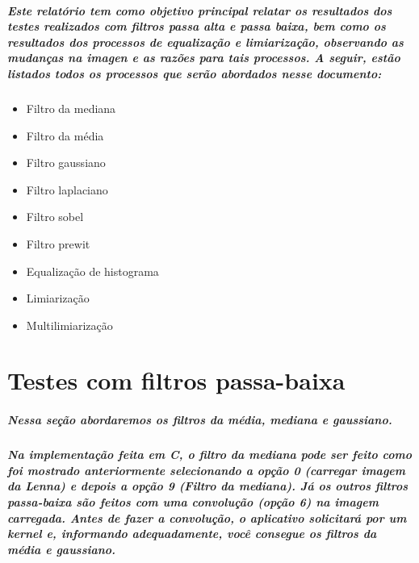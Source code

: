 \documentclass[12pt,fleqn]{article}
\begin{document}


  \subparagraph{\normalfont Este relatório tem como objetivo principal relatar os resultados dos testes realizados com filtros 
passa alta e passa baixa, bem como os resultados dos processos de equalização e limiarização, observando as mudanças
na imagen e as razões para tais processos. A seguir, estão listados todos os processos que serão abordados nesse documento:}

\begin{itemize}
  \item Filtro da mediana
  \item Filtro da média
  \item Filtro gaussiano
  \item Filtro laplaciano
  \item Filtro sobel
  \item Filtro prewit
  \item Equalização de histograma
  \item Limiarização
  \item Multilimiarização
\end{itemize}


\section{Testes com filtros passa-baixa}

  \subparagraph{\normalfont Nessa seção abordaremos os filtros da média, mediana e gaussiano.}

  \subparagraph{\normalfont Na implementação feita em C, o filtro da mediana pode ser feito como foi mostrado anteriormente selecionando a opção 0 (carregar imagem da Lenna) e depois a opção 9 (Filtro da mediana). Já os outros filtros  passa-baixa são feitos com uma convolução (opção 6) na imagem carregada. Antes de fazer a convolução, o aplicativo solicitará por um kernel e, informando adequadamente, você consegue os filtros da média e gaussiano.}
\end{document}

